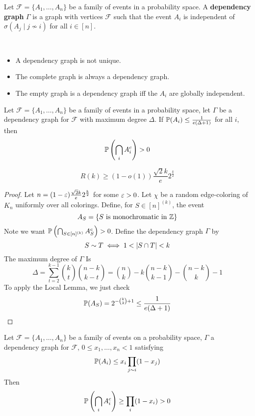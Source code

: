 \documentclass{article}
\begin{document}
\begin{dfn}
  Let $\mathcal F = \{A_1, \dots, A_n\}$ be a family of events in a probability space. A {\bf dependency graph} $\Gamma$ is a graph with vertices $\mathcal F$ such that the event $A_i$ is independent of $\sigma(A_j \mid j \not\sim i)$ for all $i \in [n]$.
\end{dfn}

\begin{rmks}~
  \begin{itemize}
    \item A dependency graph is not unique.
    \item The complete graph is always a dependency graph.
    \item The empty graph is a dependency graph iff the $A_i$ are globally independent.
  \end{itemize}
\end{rmks}

\begin{thm}
  Let $\mathcal F = \{A_1, \dots, A_n\}$ be a family of events in a probability space, let $\Gamma$ be a dependency graph for $\mathcal F$ with maximum degree $\Delta$. If $\P(A_i) \le \frac 1{e(\Delta + 1)}$ for all $i$, then
  $$\P\left(\Inter_i A_i^c\right) > 0$$
\end{thm}

\begin{thm}[Spencer]
  $$R(k) \ge (1 - o(1)) \frac{\sqrt 2k}e 2^{\frac k2}$$
\end{thm}
\begin{proof}
  Let $n = (1 - \eps)\frac{\sqrt 2k}e2^{\frac k2}$ for some $\eps > 0$. Let $\chi$ be a random edge-coloring of $K_n$ uniformly over all colorings. Define, for $S \in [n]^{(k)}$, the event
  $$A_S = \{S \text{ is monochromatic in } \Z\}$$
  Note we want $\P\left(\Inter_{S \in [n]^{(k)}} A_S^c\right) > 0$. Define the dependency graph $\Gamma$ by
  $$S \sim T \iff 1 < \abs{S \inter T} < k$$
  The maximum degree of $\Gamma$ Is
  $$\Delta = \sum_{t = 2}^{k - 1}\binom kt\binom{n - k}{k - t} = \binom nk - k\binom{n - k}{k - 1} - \binom{n - k}k - 1$$
  To apply the Local Lemma, we just check
  $$\P(A_S) = 2^{-\binom k2 + 1} \le \frac 1{e(\Delta + 1)}$$
\end{proof}

\begin{thm}
  Let $\mathcal F = \{A_1, \dots, A_n\}$ be a family of events on a probability space, $\Gamma$ a dependency graph for $\mathcal F$, $0 \le x_1, \dots, x_n < 1$ satisfying
  $$\P(A_i) \le x_i \prod_{j \sim i}(1 - x_j)$$
  Then
  $$\P\left(\Inter_i A_i^c\right) \ge \prod_i (1 - x_i) > 0$$
\end{thm}
\end{document}
